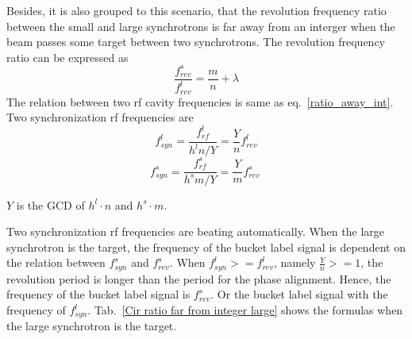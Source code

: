 %
%




Besides, it is also grouped to this scenario, that the revolution frequency ratio between the small and large synchrotrons is far away from an interger when the beam passes some target between two synchrotrons. The revolution frequency ratio can be expressed as
\begin{equation} 
\frac{f_{\mathit{rev}}^{s}}{f_{\mathit{rev}}^{l}}=\frac{m}{n}+ \lambda\label{close_to_interger2}
\end{equation}
The relation between two rf cavity frequencies is same as eq.~\ref{ratio_away_int}. Two synchronization rf frequencies are
\begin{equation}
f_{\mathit{syn}}^{l}=\frac{f_{\mathit{rf}}^{l}}{h^{l}n/Y}=\frac{Y}{n}f_{\mathit{rev}}^{l} \label{synch_freq111_r}
\end{equation}
\begin{equation}
f_{\mathit{syn}}^{s}=\frac{f_{\mathit{rf}}^{s}}{h^{s}m/Y}=\frac{Y}{m}f_{\mathit{rev}}^{s} \ \label{synch_freq222_r}
\end{equation}

$Y$ is the GCD of $h^l\cdot n$ and $h^s \cdot m$.

Two synchronization rf frequencies are beating automatically. When the large synchrotron is the target, the frequency of the bucket label signal is dependent on the relation between $f_{\mathit{syn}}^{s}$ and $f_{\mathit{rev}}^{s}$. When $f_{\mathit{syn}}^{l}>=f_{\mathit{rev}}^{l}$, namely $\frac{Y}{n}>=1$, the revolution period is longer than the period for the phase alignment. Hence, the frequency of the bucket label signal is $f_{\mathit{rev}}^{s}$. Or the bucket label signal with the frequency of $f_{\mathit{syn}}^{l}$. Tab.~\ref{Cir ratio far from integer large} shows the formulas when the large synchrotron is the target.

